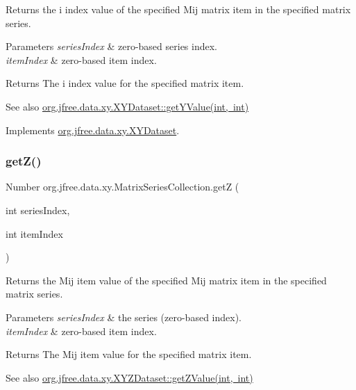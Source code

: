 Returns the i index value of the specified Mij matrix item in the specified matrix series.


\begin{DoxyParams}{Parameters}
{\em series\+Index} & zero-\/based series index. \\
\hline
{\em item\+Index} & zero-\/based item index.\\
\hline
\end{DoxyParams}
\begin{DoxyReturn}{Returns}
The i index value for the specified matrix item.
\end{DoxyReturn}
\begin{DoxySeeAlso}{See also}
\mbox{\hyperlink{interfaceorg_1_1jfree_1_1data_1_1xy_1_1_x_y_dataset_a5e86389417eb5ed7b663a952ca370914}{org.\+jfree.\+data.\+xy.\+X\+Y\+Dataset\+::get\+Y\+Value(int, int)}} 
\end{DoxySeeAlso}


Implements \mbox{\hyperlink{interfaceorg_1_1jfree_1_1data_1_1xy_1_1_x_y_dataset_aa915867221e0f94021bad3140db5254e}{org.\+jfree.\+data.\+xy.\+X\+Y\+Dataset}}.

\mbox{\label{classorg_1_1jfree_1_1data_1_1xy_1_1_matrix_series_collection_a8e762b03fe7fad0234cf73eed0947d18}} 
\subsubsection{\texorpdfstring{get\+Z()}{getZ()}}
{\footnotesize\ttfamily Number org.\+jfree.\+data.\+xy.\+Matrix\+Series\+Collection.\+getZ (\begin{DoxyParamCaption}\item[{int}]{series\+Index,  }\item[{int}]{item\+Index }\end{DoxyParamCaption})}

Returns the Mij item value of the specified Mij matrix item in the specified matrix series.


\begin{DoxyParams}{Parameters}
{\em series\+Index} & the series (zero-\/based index). \\
\hline
{\em item\+Index} & zero-\/based item index.\\
\hline
\end{DoxyParams}
\begin{DoxyReturn}{Returns}
The Mij item value for the specified matrix item.
\end{DoxyReturn}
\begin{DoxySeeAlso}{See also}
\mbox{\hyperlink{interfaceorg_1_1jfree_1_1data_1_1xy_1_1_x_y_z_dataset_a2aed0d6b0bbf979643691fc932efa2bc}{org.\+jfree.\+data.\+xy.\+X\+Y\+Z\+Dataset\+::get\+Z\+Value(int, int)}} 
\end{DoxySeeAlso}


